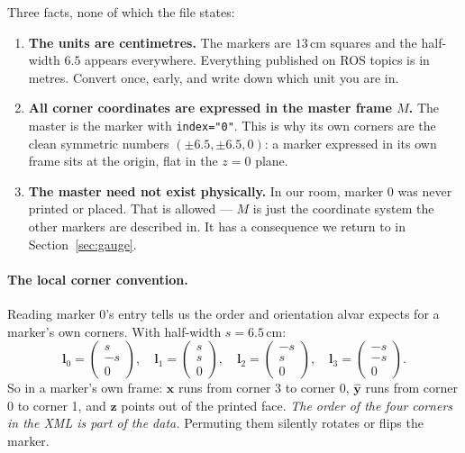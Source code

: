 \documentclass[11pt,a4paper]{article}
\newcommand{\vt}[1]{\mathbf{#1}}
\newcommand{\xh}{\hat{\vt{x}}}
\newcommand{\yh}{\hat{\vt{y}}}
\newcommand{\zh}{\hat{\vt{z}}}
\begin{document}
Three facts, none of which the file states:

\begin{enumerate}[leftmargin=*]
\item \textbf{The units are centimetres.} The markers are $13\,$cm squares and the
      half-width $6.5$ appears everywhere. Everything published on ROS topics is in
      metres. Convert once, early, and write down which unit you are in.

\item \textbf{All corner coordinates are expressed in the master frame $M$.} The master
      is the marker with \texttt{index="0"}. This is why its own corners are the clean
      symmetric numbers $(\pm 6.5, \pm 6.5, 0)$: a marker expressed in its own frame
      sits at the origin, flat in the $z=0$ plane.

\item \textbf{The master need not exist physically.} In our room, marker 0 was never
      printed or placed. That is allowed --- $M$ is just the coordinate system the other
      markers are described in. It has a consequence we return to in
      Section~\ref{sec:gauge}.
\end{enumerate}

\paragraph{The local corner convention.} Reading marker 0's entry tells us the order and
orientation alvar expects for a marker's own corners. With half-width $s = 6.5$\,cm:
\begin{equation}
  \vt{l}_0 = \begin{pmatrix}s\\-s\\0\end{pmatrix}\!,\quad
  \vt{l}_1 = \begin{pmatrix}s\\s\\0\end{pmatrix}\!,\quad
  \vt{l}_2 = \begin{pmatrix}-s\\s\\0\end{pmatrix}\!,\quad
  \vt{l}_3 = \begin{pmatrix}-s\\-s\\0\end{pmatrix}.
  \label{eq:local}
\end{equation}
So in a marker's own frame: $\xh$ runs from corner 3 to corner 0, $\yh$ runs from corner
0 to corner 1, and $\zh$ points out of the printed face. \emph{The order of the four
corners in the XML is part of the data.} Permuting them silently rotates or flips the
marker.
\end{document}

